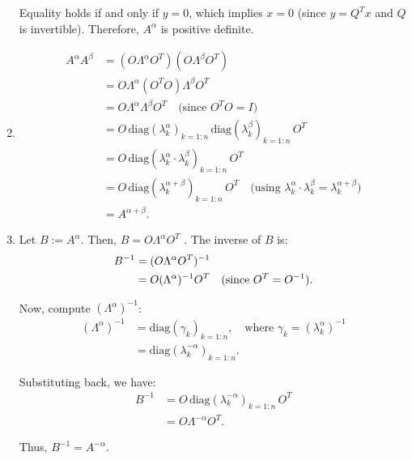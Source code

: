\documentclass{article}
\begin{document}
\begin{enumerate}
          Equality holds if and only if $y = 0$, which implies $x = 0$ (since $y = Q^T x$ and $Q$ is invertible). Therefore, $A^\alpha$ is positive definite.
    \item \begin{align*}
              A^\alpha A^\beta & = (O \Lambda^\alpha O^T)(O \Lambda^\beta O^T)                                                                                                        \\
                               & = O \Lambda^\alpha (O^T O) \Lambda^\beta O^T                                                                                                         \\
                               & = O \Lambda^\alpha \Lambda^\beta O^T \quad \text{(since $O^T O = I$)}                                                                                \\
                               & = O \, \text{diag}(\lambda_k^\alpha)_{k=1:n} \, \text{diag}(\lambda_k^\beta)_{k=1:n} \, O^T                                                          \\
                               & = O \, \text{diag}(\lambda_k^\alpha \cdot \lambda_k^\beta)_{k=1:n} \, O^T                                                                            \\
                               & = O \, \text{diag}(\lambda_k^{\alpha+\beta})_{k=1:n} \, O^T \quad \text{(using $\lambda_k^\alpha \cdot \lambda_k^\beta = \lambda_k^{\alpha+\beta}$)} \\
                               & = A^{\alpha+\beta}.
          \end{align*}
    \item Let \( B := A^\alpha \). Then, $B = O \Lambda^\alpha O^T$ . The inverse of \( B \) is:
          \begin{align*}
              B^{-1} & = (O \Lambda^\alpha O^T)^{-1}                                          \\
                     & = O (\Lambda^\alpha)^{-1} O^T \quad \text{(since \( O^T = O^{-1} \))}.
          \end{align*}

          Now, compute \( (\Lambda^\alpha)^{-1} \):
          \begin{align*}
              (\Lambda^\alpha)^{-1} & = \text{diag}(\gamma_k)_{k=1:n}, \quad \text{where } \gamma_k = (\lambda_k^\alpha)^{-1} \\
                                    & = \text{diag}(\lambda_k^{-\alpha})_{k=1:n}.
          \end{align*}

          Substituting back, we have:
          \begin{align*}
              B^{-1} & = O \, \text{diag}(\lambda_k^{-\alpha})_{k=1:n} \, O^T \\
                     & = O \Lambda^{-\alpha} O^T.
          \end{align*}

          Thus, \( B^{-1} = A^{-\alpha} \).
\end{enumerate}
\end{document}
